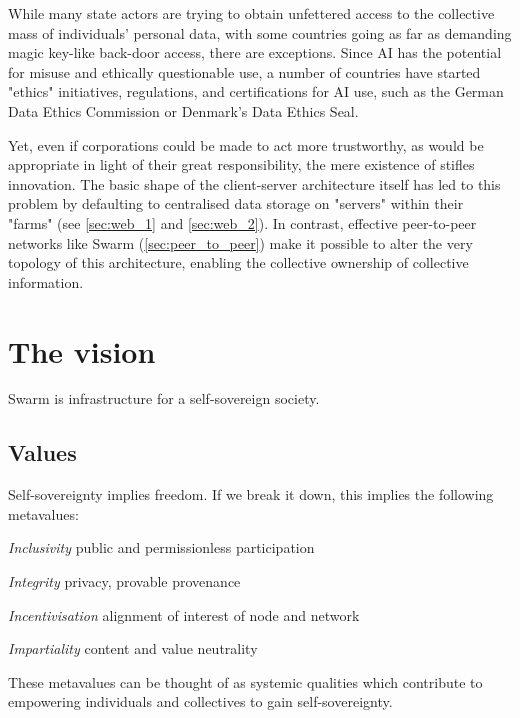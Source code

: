 While many state actors are trying to obtain unfettered access to the collective mass of individuals' personal data, with some countries going as far as demanding magic key-like back-door access, there are exceptions. Since AI has the potential for misuse and ethically questionable use, a number of countries have started "ethics" initiatives, regulations, and certifications for AI use, such as the German Data Ethics Commission or Denmark's Data Ethics Seal. 

Yet, even if corporations could be made to act more trustworthy, as would be appropriate in light of their great responsibility, the mere existence of  stifles innovation. The basic shape of the client-server architecture itself has led to this problem by defaulting to centralised data storage on "servers" within their "farms" (see \ref{sec:web_1} and \ref{sec:web_2}). In contrast, effective peer-to-peer networks like Swarm (\ref{sec:peer_to_peer}) make it possible to alter the very topology of this architecture, enabling the collective ownership of collective information. 


\section{The vision  \statusorange}\label{sec:vision}

\begin{displayquote}
Swarm is infrastructure for a self-sovereign society. 
\end{displayquote}


\subsection{Values \statusorange}\label{sec:values}

Self-sovereignty implies freedom. If we break it down, this implies the following metavalues: 

\begin{labelledlist}
\item[\emph{Inclusivity}] public and permissionless participation
\item[\emph{Integrity}] privacy, provable provenance 
\item[\emph{Incentivisation}] alignment of interest of node and network
\item[\emph{Impartiality}] content and value neutrality  
\end{labelledlist}

These metavalues can be thought of as systemic qualities which contribute to empowering individuals and collectives to gain self-sovereignty.

